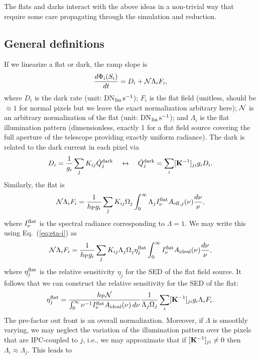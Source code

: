 \documentclass[prd,onecolumn,nofootinbib,nobibnotes]{revtex4}
\begin{document}
The flats and darks interact with the above ideas in a non-trivial way that require some care propagating through the simulation and reduction.

\subsection{General definitions}

If we linearize a flat or dark, the ramp slope is
\begin{equation}
\frac{d\Phi_i(S_i)}{dt} = D_i + {\cal N} \Lambda_i F_i,
\end{equation}
where $D_i$ is the dark rate (unit: DN$_{\rm lin}\,{\rm s}^{-1}$); $F_i$ is the flat field (unitless, should be $\approx 1$ for normal pixels but we leave the exact normalization arbitrary here); ${\cal N}$ is an arbitrary normalization of the flat (unit: DN$_{\rm lin}\,{\rm s}^{-1}$); and $\Lambda_i$ is the flat illumination pattern (dimensionless, exactly 1 for a flat field source covering the full aperture of the telescope providing exactly uniform radiance). The dark is related to the dark current in each pixel via
\begin{equation}
D_i = \frac1{g_i} \sum_j K_{ij} \dot Q^{\rm dark}_j ~~~\leftrightarrow~~~
\dot Q^{\rm dark}_j = \sum_i [{\bf K}^{-1}]_{ji} g_iD_i.
\end{equation}
Similarly, the flat is
\begin{equation}
{\cal N} \Lambda_i F_i = \frac1{h_{\rm P} g_i} \sum_j K_{ij} \Omega_j \int_0^\infty \Lambda_j I^{\rm flat}_\nu A_{{\rm eff},j}(\nu) \frac{d\nu}\nu,
\end{equation}
where $I^{\rm flat}_\nu$ is the spectral radiance corresponding to $\Lambda=1$. We may write this using Eq.~(\ref{eq:eta-i}) as
\begin{equation}
{\cal N} \Lambda_i F_i = \frac1{h_{\rm P} g_i} \sum_j K_{ij} \Lambda_j \Omega_j \eta_j^{\rm flat} \int_0^\infty I^{\rm flat}_\nu A_{{\rm ideal}}(\nu) \frac{d\nu}\nu,
\end{equation}
where $\eta_j^{\rm flat}$ is the relative sensitivity $\eta_j$ for the SED of the flat field source. It follows that we can construct the relative sensitivity for the SED of the flat:
\begin{equation}
\eta_j^{\rm flat} = \frac{h_{\rm P}{\cal N}}{\int_0^\infty \nu^{-1} I^{\rm flat}_\nu A_{{\rm ideal}}(\nu) \,d\nu} \frac1{\Lambda_j \Omega_j} \sum_i [{\bf K}^{-1}]_{ji} g_i \Lambda_i F_i.
\end{equation}
The pre-factor out front is an overall normalization. Moreover, if $\Lambda$ is smoothly varying, we may neglect the variation of the illumination pattern over the pixels that are IPC-coupled to $j$, i.e., we may approximate that if $[{\bf K}^{-1}]_{ji}\neq 0$ then $\Lambda_i \approx \Lambda_j$. This leads to
\end{document}
